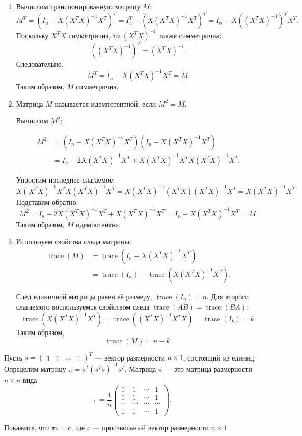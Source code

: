\documentclass[12pt]{article}
\DeclareMathOperator{\trace}{trace}
\begin{document}
\begin{sol}
   \begin{enumerate}
\item Вычислим транспонированную матрицу $M$:
\[
M^T = \left(I_n - X(X^T X)^{-1}X^T\right)^T = I_n^T - \left(X(X^T X)^{-1}X^T\right)^T = I_n - X\left((X^T X)^{-1}\right)^T X^T.
\]
Поскольку \( X^T X \) симметрична, то \( (X^T X)^{-1} \) также симметрична:
\[
\left((X^T X)^{-1}\right)^T = (X^T X)^{-1}.
\]
Следовательно,
\[
M^T = I_n - X(X^T X)^{-1}X^T = M.
\]
Таким образом, \( M \) симметрична.

\item Матрица $M$ называется идемпотентной, если $M^2 = M$.

Вычислим $M^2$:

\begin{align}
M^2 &= \left(I_n - X(X^T X)^{-1}X^T\right)\left(I_n - X(X^T X)^{-1}X^T\right) \\
&= I_n - 2X(X^T X)^{-1}X^T + X(X^T X)^{-1}X^T X(X^T X)^{-1}X^T.
\end{align}

Упростим последнее слагаемое:
\[
X(X^T X)^{-1}X^T X(X^T X)^{-1}X^T = X(X^T X)^{-1}(X^T X)(X^T X)^{-1}X^T = X(X^T X)^{-1}X^T.
\]
Подставим обратно:
\[
M^2 = I_n - 2X(X^T X)^{-1}X^T + X(X^T X)^{-1}X^T = I_n - X(X^T X)^{-1}X^T = M.
\]
Таким образом, $M$ идемпотентна.

\item Используем свойства следа матрицы:
\begin{align}
    \trace(M) &= \trace\left(I_n - X(X^T X)^{-1}X^T\right) \\
&= \trace(I_n) - \trace\left(X(X^T X)^{-1}X^T\right).
\end{align}

След единичной матрицы равен её размеру, $\trace(I_n) = n$. 
Для второго слагаемого воспользуемся свойством следа \( \trace(AB) = \trace(BA) \):
\[
\trace\left(X(X^T X)^{-1}X^T\right) = \trace\left((X^T X)^{-1}X^T X\right) = \trace(I_k) = k.
\]
Таким образом,
\[
\trace (M) = n - k.
\]
   \end{enumerate}
\end{sol}

\begin{problem}
Пусть 
$s = 
 \begin{pmatrix}
  1 & 1 & \cdots & 1
 \end{pmatrix}^{T}$ — вектор размерности $n \times 1$, состоящий из единиц.
Определим матрицу $\pi = s^{T}(s^{T}s)^{-1}s^{T}$. Матрица $\pi$ — это матрица размерности $n \times n$ вида
\[
\pi = \frac{1}{n}
 \begin{pmatrix}
  1 & 1 & \cdots & 1\\
  1 & 1 & \cdots & 1\\
  \cdots & \cdots & \cdots & \cdots \\
  1 & 1 & \cdots & 1
 \end{pmatrix}.
 \]
 
Покажите, что $\pi c = \bar c$, где $c$ — произвольный вектор размерности $n \times 1$.
\end{problem}
\end{document}
